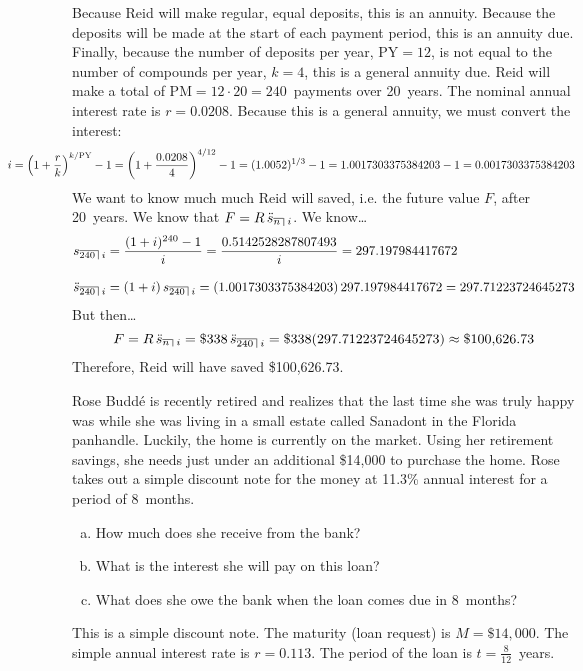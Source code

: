 \documentclass[12pt,letterpaper]{exam}
\DeclareRobustCommand{\lcroof}[1]{
  \hbox{\vtop{\vbox{%
      \hrule\kern 1pt\hbox{%
        $\scriptstyle #1$%
        \kern 1pt}}\kern1pt}%
    \vrule\kern1pt}}
\newcommand{\actS}[2]{s_{\lcroof{#1\,}{\,#2}}} %
\newcommand{\actSD}[2]{\ddot{s}_{\lcroof{#1\,}{\,#2}}} %
\begin{document}
\begin{questions}
\sol Because Reid will make regular, equal deposits, this is an annuity. Because the deposits will be made at the start of each payment period, this is an annuity due. Finally, because the number of deposits per year, $\text{PY}= 12$, is not equal to the number of compounds per year, $k= 4$, this is a general annuity due. Reid will make a total of $\text{PM}= 12 \cdot 20= 240$~payments over 20~years. The nominal annual interest rate is $r= 0.0208$. Because this is a general annuity, we must convert the interest:
	\[
	\hspace{-2cm} i= \left(1 + \dfrac{r}{k} \right)^{k/\text{PY}} - 1= \left(1 + \dfrac{0.0208}{4} \right)^{4/12} - 1= (1.0052)^{1/3} - 1= 1.0017303375384203 - 1= 0.0017303375384203 
	\]
We want to know much much Reid will saved, i.e. the future value $F$, after 20~years. We know that $F= R \, \actSD{n}{i}$. We know\dots
	\[
	\begin{aligned}
	\actS{240}{i}&= \dfrac{(1 + i)^{240} - 1}{i}= \dfrac{0.5142528287807493}{i}= 297.197984417672 \\[0.3cm]
	\actSD{240}{i}&= (1 + i) \, \actS{240}{i}= (1.0017303375384203) \, 297.197984417672= 297.71223724645273
	\end{aligned}
	\]
But then\dots
	\[
	F= R \, \actSD{n}{i}= \$338 \, \actSD{240}{i}= \$338(297.71223724645273) \approx \$100,\!626.73
	\]
Therefore, Reid will have saved \$100,626.73.
	


\newpage
\question[12] Rose Budd\'e is recently retired and realizes that the last time she was truly happy was while she was living in a small estate called Sanadont in the Florida panhandle. Luckily, the home is currently on the market. Using her retirement savings, she needs just under an additional \$14,000 to purchase the home. Rose takes out a simple discount note for the money at 11.3\% annual interest for a period of 8~months. 
	\begin{enumerate}[(a)]
	\item How much does she receive from the bank?
	\item What is the interest she will pay on this loan?
	\item What does she owe the bank when the loan comes due in 8~months?
	\end{enumerate} \pspace

\sol This is a simple discount note. The maturity (loan request) is $M= \$14,\!000$. The simple annual interest rate is $r= 0.113$. The period of the loan is $t= \frac{8}{12}$~years. 


\end{questions}
\end{document}

